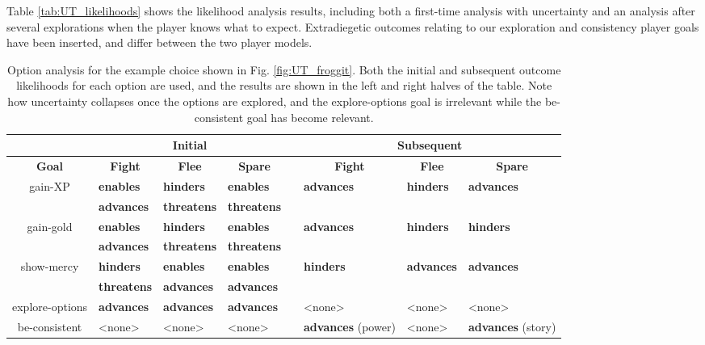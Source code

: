 \documentclass[arts,article,submit,moreauthors,pdftex,10pt,a4paper]{Definitions/mdpi}
\newcommand{\enables}{\textbf{\color{enables}enables}}
\newcommand{\advances}{\textbf{\color{advances}advances}}
\newcommand{\threatens}{\textbf{\color{threatens}threatens}}
\newcommand{\hinders}{\textbf{\color{hinders}hinders}}
\begin{document}
Table \ref{tab:UT_likelihoods} shows the likelihood analysis results, including both a first-time analysis with uncertainty and an analysis after several explorations when the player knows what to expect.
%
Extradiegetic outcomes relating to our exploration and consistency player goals have been inserted, and differ between the two player models.


\begin{table}[H]
\centering
\begin{tabular}{c l l l c l l l}
  \toprule
  & \multicolumn{3}{c}{\textbf{Initial}} && \multicolumn{3}{c}{\textbf{Subsequent}} \\
  \midrule
  \textbf{Goal} & \multicolumn{1}{c}{\textbf{Fight}} & \multicolumn{1}{c}{\textbf{Flee}} & \multicolumn{1}{c}{\textbf{Spare}} && \multicolumn{1}{c}{\textbf{Fight}} & \multicolumn{1}{c}{\textbf{Flee}} & \multicolumn{1}{c}{\textbf{Spare}} \\
  \midrule
  \multirow{2}{7em}{\centering gain-XP} & \enables{} & \hinders{} & \enables{} && \multirow{2}{4.5em}{\advances{}} & \multirow{2}{4.5em}{\hinders{}} & \multirow{2}{4.5em}{\advances{}} \\
                                        & \advances{} & \threatens{} & \threatens{} && & & \\
  \midrule
  \multirow{2}{7em}{\centering gain-gold} & \enables{} & \hinders{} & \enables{} && \multirow{2}{4.5em}{\advances{}} & \multirow{2}{4.5em}{\hinders{}} & \multirow{2}{4.5em}{\hinders{}} \\
                                          & \advances{} & \threatens{} & \threatens{} && & & \\
  \midrule
  \multirow{2}{7em}{\centering show-mercy} & \hinders{} & \enables{} & \enables{} && \multirow{2}{4.5em}{\hinders{}} & \multirow{2}{4.5em}{\advances{}} & \multirow{2}{4.5em}{\advances{}} \\
                                          & \threatens{} & \advances{} & \advances{} \\
  \midrule
  explore-options & \advances{} & \advances{} & \advances{} && <none> & <none> & <none> \\
  \midrule
  be-consistent & <none> & <none> & <none> && \advances{} (power) & <none> & \advances{} (story) \\
  \midrule
  \bottomrule
\end{tabular}
\caption[\emph{Undertale}option analysis]{Option analysis for the example choice shown in Fig. \ref{fig:UT_froggit}. Both the initial and subsequent outcome likelihoods for each option are used, and the results are shown in the left and right halves of the table. Note how uncertainty collapses once the options are explored, and the explore-options goal is irrelevant while the be-consistent goal has become relevant.}
\label{tab:UT_options}
\end{table}
\end{document}
